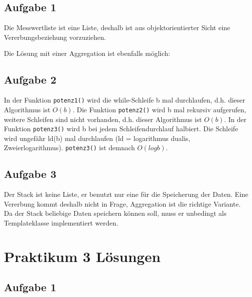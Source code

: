 \documentclass{scrartcl}
\newcommand{\basepath}{praktika/}
\begin{document}
\subsection{Aufgabe 1}
Die Messwertliste ist eine Liste, deshalb ist aus objektorientierter Sicht eine Vererbungsbeziehung vorzuziehen.



Die Lösung mit einer Aggregation ist ebenfalls möglich:



\subsection{Aufgabe 2}
In der Funktion \lstinline!potenz1()! wird die while-Schleife b mal durchlaufen, d.h. dieser Algorithmus ist $O(b)$.
Die Funktion \lstinline!potenz2()! wird b mal rekursiv aufgerufen, weitere Schleifen sind nicht vorhanden, d.h. dieser
Algorithmus ist $O(b)$.
In der Funktion \lstinline!potenz3()! wird b bei jedem Schleifendurchlauf halbiert. Die Schleife wird ungefähr ld(b)
mal durchlaufen (ld = logarithmus dualis, Zweierlogarithmus). \lstinline!potenz3()! ist demnach $O(log b)$.
\subsection{Aufgabe 3}
Der Stack ist keine Liste, er benutzt nur eine für die Speicherung der Daten. Eine Vererbung kommt deshalb
nicht in Frage, Aggregation ist die richtige Variante. Da der Stack beliebige Daten speichern können soll,
muss er unbedingt als Templateklasse implementiert werden.








\section{Praktikum 3 Lösungen}
\subsection{Aufgabe 1}


\end{document}
